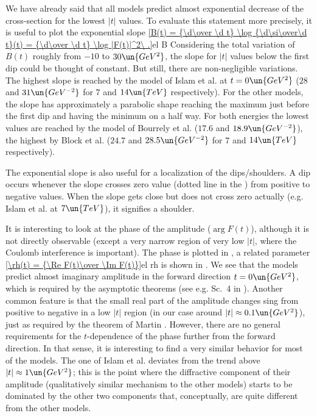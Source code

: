 We have already said that all models predict almost exponential decrease of the cross-section for the lowest $|t|$ values. To evaluate this statement more precisely, it is useful to plot the exponential slope
\eqref{B(t) = {\d\over \d t} \log {\d\si\over\d t}(t) = {\d\over \d t} \log |F(t)|^2\ .}{el B}
Considering the total variation of $B(t)$ roughly from $-10$ to $30\un{GeV^2}$, the slope for $|t|$ values below the first dip could be thought of constant. But still, there are non-negligible variations. The highest slope is reached by the model of Islam et al. at $t=0\un{GeV^2}$ ($28$ and $31\un{GeV^{-2}}$ for $7$ and $14\un{TeV}$ respectively). For the other models, the slope has approximately a parabolic shape reaching the maximum just before the first dip and having the minimum on a half way. For both energies the lowest values are reached by the model of Bourrely et al. ($17.6$ and $18.9\un{GeV^{-2}}$), the highest by Block et al. ($24.7$ and $28.5\un{GeV^{-2}}$ for $7$ and $14\un{TeV}$ respectively).

The exponential slope is also useful for a localization of the dips/shoulders. A dip occurs whenever the slope crosses zero value (dotted line in the ) from positive to negative values. When the slope gets close but does not cross zero actually (e.g. Islam et al. at $7\un{TeV}$), it signifies a shoulder.


It is interesting to look at the phase of the amplitude ($\arg F(t)$), although it is not directly observable (except a very narrow region of very low $|t|$, where the Coulomb interference is important). The phase is plotted in , a related parameter 
\eqref{\rh(t) = {\Re F(t)\over \Im F(t)}}{el rh}
is shown in . We see that the models predict almost imaginary amplitude in the forward direction $t=0\un{GeV^2}$, which is required by the asymptotic theorems (see e.g. Sc.~4 in ). Another common feature is that the small real part of the amplitude changes sing from positive to negative in a low $|t|$ region (in our case around $|t| \approx 0.1\un{GeV^2}$), just as required by the theorem of Martin . However, there are no general requirements for the $t$-dependence of the phase further from the forward direction. In that sense, it is interesting to find a very similar behavior for most of the models. The one of Islam et al. deviates from the trend above $|t|\approx 1\un{GeV^2}$; this is the point where the diffractive component of their amplitude (qualitatively similar mechanism to the other models) starts to be dominated by the other two components that, conceptually, are quite different from the other models.

